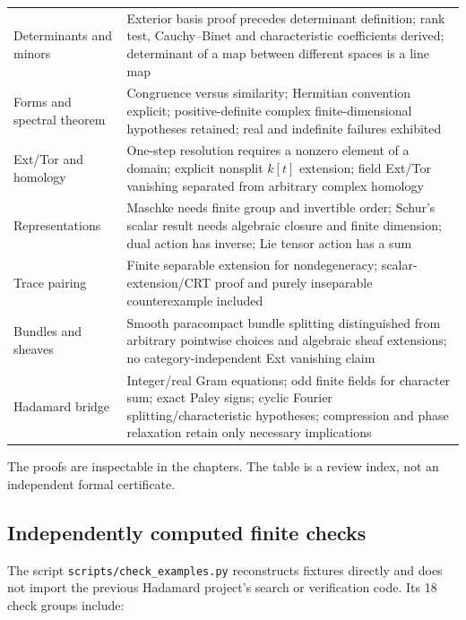 \documentclass[
  11pt,
]{article}
\begin{document}
\begin{longtable}[]{@{}
  >{\raggedright\arraybackslash}p{}
  >{\raggedright\arraybackslash}p{}@{}}
Determinants and minors & Exterior basis proof precedes determinant
definition; rank test, Cauchy--Binet and characteristic coefficients
derived; determinant of a map between different spaces is a line map \\
Forms and spectral theorem & Congruence versus similarity; Hermitian
convention explicit; positive-definite complex finite-dimensional
hypotheses retained; real and indefinite failures exhibited \\
Ext/Tor and homology & One-step resolution requires a nonzero element of
a domain; explicit nonsplit \(k[t]\) extension; field Ext/Tor vanishing
separated from arbitrary complex homology \\
Representations & Maschke needs finite group and invertible order;
Schur's scalar result needs algebraic closure and finite dimension; dual
action has inverse; Lie tensor action has a sum \\
Trace pairing & Finite separable extension for nondegeneracy;
scalar-extension/CRT proof and purely inseparable counterexample
included \\
Bundles and sheaves & Smooth paracompact bundle splitting distinguished
from arbitrary pointwise choices and algebraic sheaf extensions; no
category-independent Ext vanishing claim \\
Hadamard bridge & Integer/real Gram equations; odd finite fields for
character sum; exact Paley signs; cyclic Fourier
splitting/characteristic hypotheses; compression and phase relaxation
retain only necessary implications \\
\end{longtable}

The proofs are inspectable in the chapters. The table is a review index,
not an independent formal certificate.

\subsection{Independently computed finite
checks}\label{independently-computed-finite-checks}

The script \texttt{scripts/check\_examples.py} reconstructs fixtures
directly and does not import the previous Hadamard project's search or
verification code. Its 18 check groups include:
\end{document}
